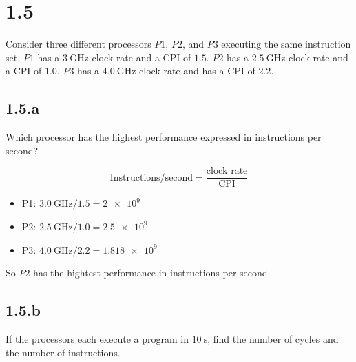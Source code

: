\documentclass[paper=a4, fontsize=11pt]{scrartcl} %
\begin{document}
\maketitle %

\section{1.5}

\begin{fancyquotes}
  Consider three different processors $P1$, $P2$, and $P3$ executing
  the same instruction set. $P1$ has a $\SI{3}{\giga\hertz}$ clock
  rate and a CPI of $1.5$. $P2$ has a $\SI{2.5}{\giga\hertz}$ clock
  rate and a CPI of $1.0$. $P3$ has a $\SI{4.0}{\giga\hertz}$ clock
  rate and has a CPI of $2.2$.
\end{fancyquotes}

\subsection{1.5.a}
\begin{fancyquotes}
  Which processor has the highest performance expressed in
  instructions per second?
\end{fancyquotes}

$$\text{Instructions} / \text{second} = \frac{\text{clock rate}}{\text{CPI}}$$

\begin{itemize}
\item{P1:} $\SI{3.0}{\giga\hertz} / 1.5 = \SI{2e9}{}$
\item{P2:} $\SI{2.5}{\giga\hertz} / 1.0 = \SI{2.5e9}{}$
\item{P3:} $\SI{4.0}{\giga\hertz} / 2.2 = \SI{1.818e9}{}$
\end{itemize}

So $P2$ has the hightest performance in instructions per second.

\subsection{1.5.b}
\begin{fancyquotes}
  If the processors each execute a program in $\SI{10}{\second}$,
  find the number of cycles and the number of instructions.
\end{fancyquotes}
\end{document}
